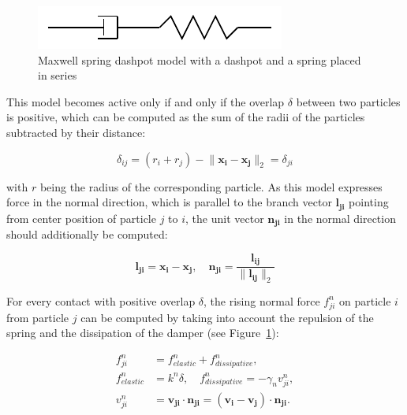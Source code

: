\documentclass[11pt,
               a4paper,
               bibtotoc,
               idxtotoc,
               headsepline,
               footsepline,
               footexclude,
               BCOR12mm,
               DIV13,
               openany,   %
               ]
               {scrbook}
\begin{document}
 \begin{figure}[H] %
	\centering
	\includegraphics[width=.5\columnwidth]{figures/maxwell_spring_dashpot.pdf}
	\caption[Example Figure]{Maxwell spring dashpot model with a dashpot and a spring placed in series}
	\label{fig:maxwell_spring_dashpot} %
\end{figure}

This model becomes active only if and only if the overlap $\delta$ between two particles is positive, which can be computed as the sum of the radii of the particles subtracted by their distance:

\begin{equation}
	\delta_{ij} = (r_i + r_j) - \lVert \mathbf{x_i} -\mathbf{ x_j} \rVert_2 = \delta_{ji} 
	\label{overlap_equation}
\end{equation}

with $r$ being the radius of the corresponding particle.
As this model expresses force in the normal direction, which is parallel to the branch vector $\mathbf{l_{ji}}$ pointing from center position of particle $j$ to $i$, the unit vector $\mathbf{n_{ji}}$ in the normal direction should additionally be computed:

\begin{equation}
	\mathbf{l_{ji}} =  \mathbf{x_i} - \mathbf{x_j}, \quad \mathbf{n_{ji}} =\frac{\mathbf{l_{ij}}}{\lVert \mathbf{l_{ij}} \rVert_2}
\end{equation}

For every contact with positive overlap $\delta$, the rising normal force $f_{ji}^n$ on particle $i$ from particle $j$ can be computed by taking into account the repulsion of the spring and the dissipation of the damper (see Figure~\ref{fig:maxwell_spring_dashpot}):

\begin{align}
	f_{ji}^n &= f^n_{elastic} + f^n_{dissipative}, \label{linear_normal_contact_model_equation1} \\
	f^n_{elastic} &= k^n\delta, \quad f^n_{dissipative} = - \gamma_n v_{ji}^n, \label{linear_normal_contact_model_equation2} \\
	v_{ji}^n &= \mathbf{v_{ji}} \cdot \mathbf{n_{ji}} = (\mathbf{v_i} - \mathbf{v_j}) \cdot \mathbf{n_{ji}}. \label{linear_normal_contact_model_equation3}
\end{align}
\end{document}
